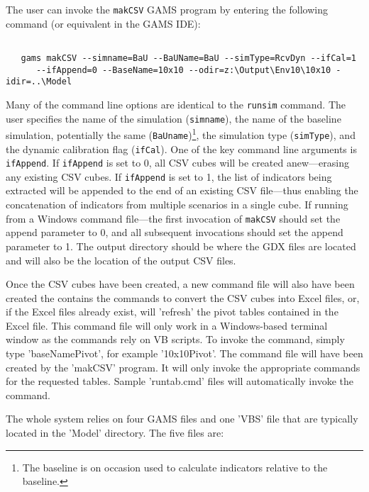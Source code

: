 The user can invoke the \texttt{makCSV} GAMS program by entering the following
command (or equivalent in the GAMS IDE):

\begin{verbatim}

   gams makCSV --simname=BaU --BaUName=BaU --simType=RcvDyn --ifCal=1
      --ifAppend=0 --BaseName=10x10 --odir=z:\Output\Env10\10x10 -idir=..\Model

\end{verbatim}

Many of the command line options are identical to the \texttt{runsim} command. The user
specifies the name of the simulation (\texttt{simname}), the name of the baseline
simulation, potentially the same (\texttt{BaUname})\footnote{The baseline is on occasion
used to calculate indicators relative to the baseline.}, the simulation type (\texttt{simType}),
and the dynamic calibration flag (\texttt{ifCal}). One of the key command line
arguments is \texttt{ifAppend}. If \texttt{ifAppend} is set to 0, all CSV cubes will be
created anew---erasing any existing CSV cubes. If \texttt{ifAppend} is set to 1, the list
of indicators being extracted will be appended to the end of an existing CSV file---thus
enabling the concatenation of indicators from multiple scenarios in a single cube. If
running from a Windows command file---the first invocation of \texttt{makCSV} should
set the append parameter to 0, and all subsequent invocations should set the append
parameter to 1. The output directory should be where the GDX files are located and will
also be the location of the output CSV files.

Once the CSV cubes have been created, a new command file will also have
been created the contains the commands to convert the CSV cubes into Excel files,
or, if the Excel files already exist, will 'refresh' the pivot tables contained
in the Excel file. This command file will only work in a Windows-based terminal
window as the commands rely on VB scripts. To invoke the command, simply
type 'baseNamePivot', for example '10x10Pivot'. The command file will have been created by the
'makCSV' program. It will only invoke the appropriate commands for the requested
tables. Sample 'runtab.cmd' files will automatically invoke the command.

The whole system relies on four GAMS files and one 'VBS' file that are typically located in the
'Model' directory. The five files are:

